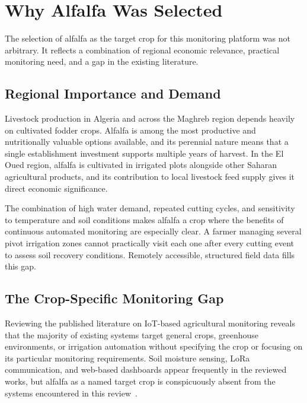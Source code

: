 \section{Why Alfalfa Was Selected}
\label{sec:why-alfalfa}

The selection of alfalfa as the target crop for this monitoring platform was not
arbitrary. It reflects a combination of regional economic relevance, practical
monitoring need, and a gap in the existing literature.

\subsection{Regional Importance and Demand}
\label{subsec:alfalfa-regional-importance}

Livestock production in Algeria and across the Maghreb region depends heavily on
cultivated fodder crops. Alfalfa is among the most productive and nutritionally
valuable options available, and its perennial nature means that a single
establishment investment supports multiple years of harvest. In the El Oued
region, alfalfa is cultivated in irrigated plots alongside other Saharan
agricultural products, and its contribution to local livestock feed supply gives
it direct economic significance.

The combination of high water demand, repeated cutting cycles, and sensitivity to
temperature and soil conditions makes alfalfa a crop where the benefits of
continuous automated monitoring are especially clear. A farmer managing several
pivot irrigation zones cannot practically visit each one after every cutting event
to assess soil recovery conditions. Remotely accessible, structured field data
fills this gap.

\subsection{The Crop-Specific Monitoring Gap}
\label{subsec:alfalfa-gap}

Reviewing the published literature on IoT-based agricultural monitoring reveals
that the majority of existing systems target general crops, greenhouse environments,
or irrigation automation without specifying the crop or focusing on its particular
monitoring requirements. Soil moisture sensing, LoRa communication, and web-based
dashboards appear frequently in the reviewed works, but alfalfa as a named target
crop is conspicuously absent from the systems encountered in this
review~\cite{ahmed2022lora_agriculture_chile,pereira2023esp32_drip_irrigation,saban2023smart_agricultural_lora_cloud}.

